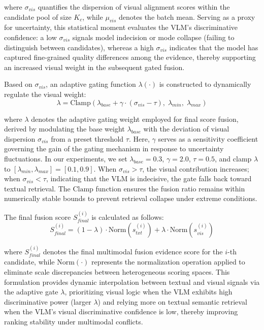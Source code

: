 \documentclass[a4paper, fleqn]{cas-dc}
\begin{document}
where $\sigma_{vis}$ quantifies the dispersion of visual alignment scores within the candidate pool of size $K_c$, while $\mu_{vis}$ denotes the batch mean.
Serving as a proxy for uncertainty, this statistical moment evaluates the VLM's discriminative confidence: a low $\sigma_{vis}$ signals model indecision or mode collapse (failing to distinguish between candidates), whereas a high $\sigma_{vis}$ indicates that the model has captured fine-grained quality differences among the evidence, thereby supporting an increased visual weight in the subsequent gated fusion.

Based on $\sigma_{vis}$, an adaptive gating function $\lambda(\cdot)$ is constructed to dynamically regulate the visual weight:
\begin{equation}
\lambda = \text{Clamp} (\lambda_{base} + \gamma \cdot (\sigma_{vis} - \tau),\; \lambda_{min},\; \lambda_{max})
\label{eq:adaptive_gate}
\end{equation}

where $\lambda$ denotes the adaptive gating weight employed for final score fusion, derived by modulating the base weight $\lambda_{base}$ with the deviation of visual dispersion $\sigma_{vis}$ from a preset threshold $\tau$.
Here, $\gamma$ serves as a sensitivity coefficient governing the gain of the gating mechanism in response to uncertainty fluctuations.
In our experiments, we set $\lambda_{base} = 0.3$, $\gamma = 2.0$, $\tau = 0.5$, and clamp $\lambda$ to $[\lambda_{min}, \lambda_{max}] = [0.1, 0.9]$.
When $\sigma_{vis} > \tau$, the visual contribution increases; when $\sigma_{vis} < \tau$, indicating that the VLM is indecisive, the gate falls back toward textual retrieval.
The $\text{Clamp}$ function ensures the fusion ratio remains within numerically stable bounds to prevent retrieval collapse under extreme conditions.

The final fusion score $S_{final}^{(i)}$ is calculated as follows:
\begin{equation}
S_{final}^{(i)} = (1 - \lambda) \cdot \text{Norm}(s_{txt}^{(i)}) + \lambda \cdot \text{Norm}(s_{vis}^{(i)})
\label{eq:final_score}
\end{equation}

where $S_{final}^{(i)}$ denotes the final multimodal fusion evidence score for the $i$-th candidate, while $\text{Norm}(\cdot)$ represents the normalization operation applied to eliminate scale discrepancies between heterogeneous scoring spaces.
This formulation provides dynamic interpolation between textual and visual signals via the adaptive gate $\lambda$, prioritizing visual logic when the VLM exhibits high discriminative power (larger $\lambda$) and relying more on textual semantic retrieval when the VLM's visual discriminative confidence is low, thereby improving ranking stability under multimodal conflicts.
\end{document}
